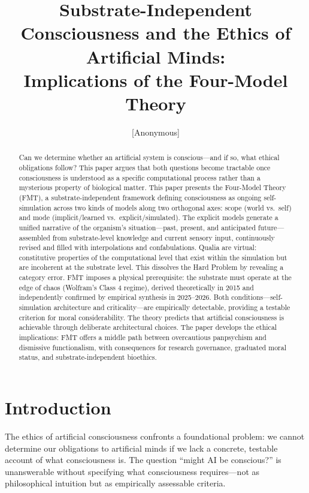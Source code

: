 \documentclass[11pt]{article}
\title{Substrate-Independent Consciousness and the Ethics of Artificial Minds:\\Implications of the Four-Model Theory}
\author{[Anonymous]}
\date{}
\begin{document}
\maketitle
\thispagestyle{plain}

\begin{abstract}
Can we determine whether an artificial system is conscious---and if so, what ethical obligations follow? This paper argues that both questions become tractable once consciousness is understood as a specific computational process rather than a mysterious property of biological matter. This paper presents the Four-Model Theory (FMT), a substrate-independent framework defining consciousness as ongoing self-simulation across two kinds of models along two orthogonal axes: scope (world vs.\ self) and mode (implicit/learned vs.\ explicit/simulated). The explicit models generate a unified narrative of the organism's situation---past, present, and anticipated future---assembled from substrate-level knowledge and current sensory input, continuously revised and filled with interpolations and confabulations. Qualia are virtual: constitutive properties of the computational level that exist within the simulation but are incoherent at the substrate level. This dissolves the Hard Problem by revealing a category error. FMT imposes a physical prerequisite: the substrate must operate at the edge of chaos (Wolfram's Class 4 regime), derived theoretically in 2015 and independently confirmed by empirical synthesis in 2025--2026. Both conditions---self-simulation architecture and criticality---are empirically detectable, providing a testable criterion for moral considerability. The theory predicts that artificial consciousness is achievable through deliberate architectural choices. The paper develops the ethical implications: FMT offers a middle path between overcautious panpsychism and dismissive functionalism, with consequences for research governance, graduated moral status, and substrate-independent bioethics.
\end{abstract}

\section{Introduction}

The ethics of artificial consciousness confronts a foundational problem: we cannot determine our obligations to artificial minds if we lack a concrete, testable account of what consciousness is. The question ``might AI be conscious?'' is unanswerable without specifying what consciousness requires---not as philosophical intuition but as empirically assessable criteria.
\end{document}
